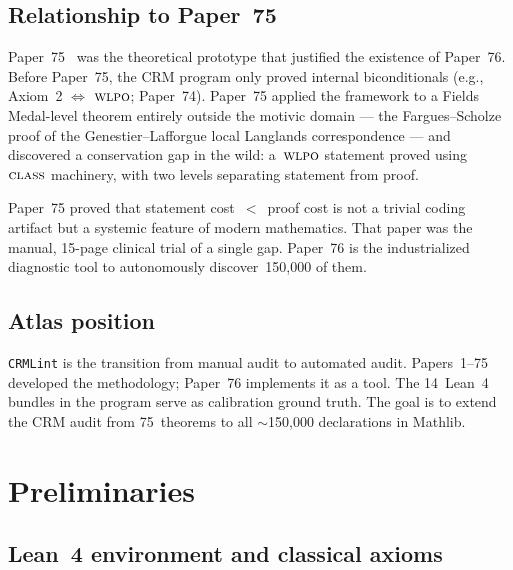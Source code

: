\documentclass[12pt, a4paper]{article}
\theoremstyle{plain}
\theoremstyle{definition}
\theoremstyle{remark}
\newcommand{\WLPO}{\textsc{wlpo}}
\newcommand{\CLASS}{\textsc{class}}
\newcommand{\CRMLint}{\texttt{CRMLint}}
\begin{document}
\subsection{Relationship to Paper~75}

Paper~75~\cite{lee-p75} was the theoretical prototype that justified
the existence of Paper~76.  Before Paper~75, the CRM program only
proved internal biconditionals (e.g., Axiom~2 $\Leftrightarrow$
$\WLPO$; Paper~74).  Paper~75 applied the framework to a Fields
Medal-level theorem entirely outside the motivic domain --- the
Fargues--Scholze proof of the Genestier--Lafforgue local Langlands
correspondence --- and discovered a conservation gap in the wild:
a~$\WLPO$ statement proved using~$\CLASS$ machinery, with two
levels separating statement from proof.

Paper~75 proved that statement cost~$<$~proof cost is not a
trivial coding artifact but a systemic feature of modern
mathematics.  That paper was the manual, 15-page clinical trial
of a single gap.  Paper~76 is the industrialized diagnostic
tool to autonomously discover~150,000 of them.

\subsection{Atlas position}

\CRMLint{} is the transition from manual audit to automated audit.
Papers~1--75 developed the methodology; Paper~76 implements it as
a tool.  The 14~Lean~4 bundles in the program serve as calibration
ground truth.  The goal is to extend the CRM audit from 75~theorems
to all $\sim$150,000 declarations in Mathlib.


\section{Preliminaries}\label{sec:prelim}

\subsection{Lean~4 environment and classical axioms}
\end{document}

